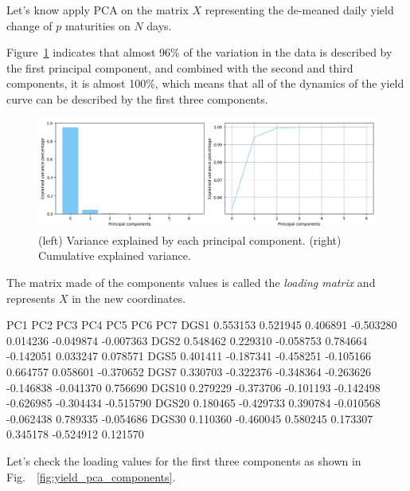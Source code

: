 Let's know apply PCA on the matrix $X$ representing the de-meaned daily yield change of $p$ maturities on $N$ days.


Figure~\ref{fig:pca_explained_variance} indicates that almost 96\% of the variation in the data is described by the first principal component, and combined with the second and third components, it is almost 100\%, which means that all of the dynamics of the yield curve can be described by the first three components.

\begin{figure}[hbtp]
	\centering
	\includegraphics[width=0.8\linewidth]{figures/pca_explained_variance}
	\caption{(left) Variance explained by each principal component. (right) Cumulative explained variance.}
	\label{fig:pca_explained_variance}
\end{figure}

The matrix made of the components values is called the \emph{loading matrix} and represents $X$ in the new coordinates.

\begin{ioutput}
            PC1       PC2       PC3       PC4       PC5       PC6       PC7
DGS1   0.553153  0.521945  0.406891 -0.503280  0.014236 -0.049874 -0.007363
DGS2   0.548462  0.229310 -0.058753  0.784664 -0.142051  0.033247  0.078571
DGS5   0.401411 -0.187341 -0.458251 -0.105166  0.664757  0.058601 -0.370652
DGS7   0.330703 -0.322376 -0.348364 -0.263626 -0.146838 -0.041370  0.756690
DGS10  0.279229 -0.373706 -0.101193 -0.142498 -0.626985 -0.304434 -0.515790
DGS20  0.180465 -0.429733  0.390784 -0.010568 -0.062438  0.789335 -0.054686
DGS30  0.110360 -0.460045  0.580245  0.173307  0.345178 -0.524912  0.121570
\end{ioutput}

Let's check the loading values for the first three components as shown in Fig.~~\ref{fig:yield_pca_components}.
 
